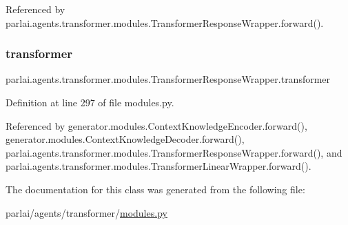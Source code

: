 Referenced by parlai.\+agents.\+transformer.\+modules.\+Transformer\+Response\+Wrapper.\+forward().

\mbox{\label{classparlai_1_1agents_1_1transformer_1_1modules_1_1TransformerResponseWrapper_ae757bd573993a3ca4a31e9d65b1a7e9a}} 
\subsubsection{\texorpdfstring{transformer}{transformer}}
{\footnotesize\ttfamily parlai.\+agents.\+transformer.\+modules.\+Transformer\+Response\+Wrapper.\+transformer}



Definition at line 297 of file modules.\+py.



Referenced by generator.\+modules.\+Context\+Knowledge\+Encoder.\+forward(), generator.\+modules.\+Context\+Knowledge\+Decoder.\+forward(), parlai.\+agents.\+transformer.\+modules.\+Transformer\+Response\+Wrapper.\+forward(), and parlai.\+agents.\+transformer.\+modules.\+Transformer\+Linear\+Wrapper.\+forward().



The documentation for this class was generated from the following file\+:\begin{DoxyCompactItemize}
\item 
parlai/agents/transformer/\hyperlink{parlai_2agents_2transformer_2modules_8py}{modules.\+py}\end{DoxyCompactItemize}
